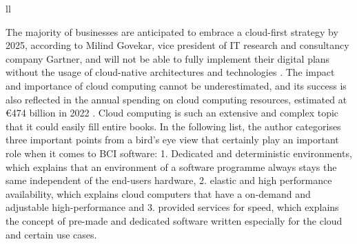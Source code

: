 \begin{table}[!ht]
{\begin{tabular}{ll}
       \\ \hline
    \end{tabular}%
  }
  \vspace{10pt}
  \caption{The three abstraction levels and types of cloud computing \citep{amazon_web_services_inc_what_nodate}.}
  \label{tab:cloud-computing-types}
\end{table}
\raggedbottom

The majority of businesses are anticipated to embrace a cloud-first strategy by 2025, according to Milind Govekar, vice president of IT research and consultancy company Gartner, and will not be able to fully implement their digital plans without the usage of cloud-native architectures and technologies \citep{gartner_gartner_nodate}. The impact and importance of cloud computing cannot be underestimated, and its success is also reflected in the annual spending on cloud computing resources, estimated at €474 billion in 2022 \citep{gartner_gartner_nodate}. Cloud computing is such an extensive and complex topic that it could easily fill entire books. In the following list, the author categorises three important points from a bird's eye view that certainly play an important role when it comes to BCI software: 1. Dedicated and deterministic environments, which explains that an environment of a software programme always stays the same independent of the end-users hardware, 2. elastic and high performance availability, which explains cloud computers that have a on-demand and adjustable high-performance and 3. provided services for speed, which explains the concept of pre-made and dedicated software written especially for the cloud and certain use cases.

